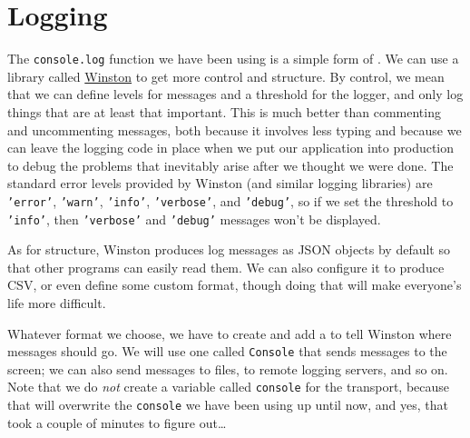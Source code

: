 \chapter{Logging}\label{s:logging}

The \texttt{console.log} function we have been using
is a simple form of .
We can use a library called \href{https://github.com/winstonjs/winston}{Winston} to get more control and structure.
By control,
we mean that we can define levels for messages and a threshold for the logger,
and only log things that are at least that important.
This is much better than commenting and uncommenting messages,
both because it involves less typing
and because we can leave the logging code in place when we put our application into production
to debug the problems that inevitably arise after we thought we were done.
The standard error levels provided by Winston (and similar logging libraries)
are \texttt{'error'}, \texttt{'warn'}, \texttt{'info'}, \texttt{'verbose'}, and \texttt{'debug'},
so if we set the threshold to \texttt{'info'},
then \texttt{'verbose'} and \texttt{'debug'} messages won't be displayed.

As for structure,
Winston produces log messages as JSON objects by default
so that other programs can easily read them.
We can also configure it to produce CSV,
or even define some custom format,
though doing that will make everyone's life more difficult.

Whatever format we choose,
we have to create and add a  to tell Winston where messages should go.
We will use one called \texttt{Console} that sends messages to the screen;
we can also send messages to files, to remote logging servers, and so on.
Note that we do \emph{not} create a variable called \texttt{console} for the transport,
because that will overwrite the \texttt{console} we have been using up until now,
and yes, that took a couple of minutes to figure out{\ldots}

